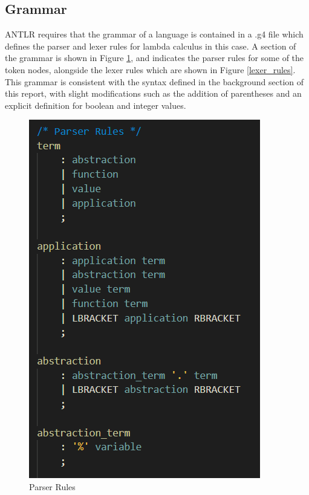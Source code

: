 \documentclass[a4paper,11pt]{report}
\begin{document}
\subsection{Grammar}

ANTLR requires that the grammar of a language is contained in a .g4 file which defines the parser and lexer rules for lambda calculus in this case. A section of the grammar is shown in Figure \ref{parser_rules}, and indicates the parser rules for some of the token nodes, alongside the lexer rules which are shown in Figure \ref{lexer_rules}. This grammar is consistent with the syntax defined in the background section of this report, with slight modifications such as the addition of parentheses and an explicit definition for boolean and integer values.

\begin{figure}[p]
\centering
\includegraphics[scale=0.75]{images/parser_rules}
\caption{Parser Rules}
\label{parser_rules}
\end{figure}
\end{document}
